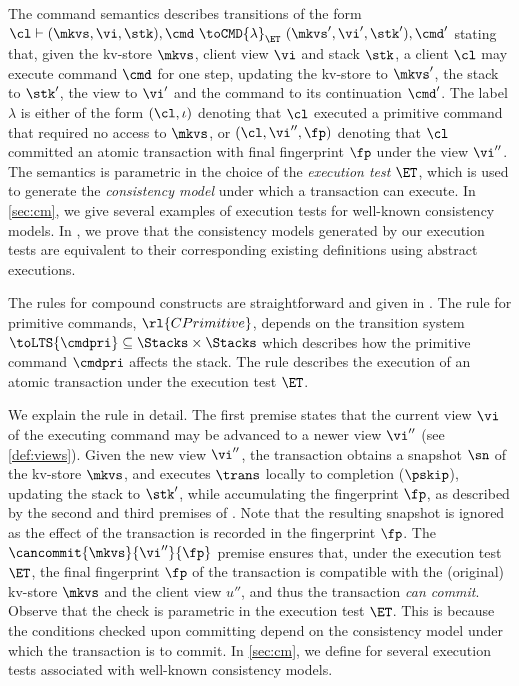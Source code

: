 %
The command semantics describes transitions of the form
\(\cl \vdash (\mkvs, \vi, \stk), \cmd \ \toCMD{\lambda}_{\ET} \ (\mkvs', \vi', \stk'), \cmd'\)
stating that,  given the kv-store \(\mkvs\), client view \(\vi\) and stack \(\stk\), 
a client \(\cl\) may execute command \(\cmd\) for one step, updating 
the kv-store to \(\mkvs'\), the stack to \(\stk'\), the view to \( \vi' \) and the command to its continuation \(\cmd'\).
The label \(\lambda\) is either of the form \((\cl, \iota)\) denoting that \(\cl\) executed a primitive command
that required no access to \(\mkvs\), 
or \((\cl, \vi'', \fp)\) denoting that \(\cl\) committed an atomic transaction with final fingerprint \(\fp\) under the view \(\vi''\).
The semantics is parametric in the choice of the \emph{execution test}
\(\ET\), which is used to generate the \emph{consistency model} under which a transaction can execute.
In \cref{sec:cm},  we give several examples of execution tests for well-known consistency models.
In \cite{shale-phd},  we prove that the consistency models generated by our execution tests are equivalent to their corresponding existing definitions using abstract executions. 

The rules for compound constructs are straightforward and given in \cite{shale-phd}.
The rule for primitive commands, \(\rl{CPrimitive}\), depends on the 
transition system \(\toLTS{\cmdpri} \subseteq \Stacks \times \Stacks\) 
which describes how the primitive command \(\cmdpri\) affects the stack.
The  rule describes the execution of an atomic 
transaction under the execution test \(\ET\). 


We explain the  rule in detail. 
The first premise states that the current view \(\vi\) of the executing command may be advanced to a newer view \(\vi''\) (see \cref{def:views}). 
Given the new view \(\vi''\), the transaction obtains a snapshot \(\sn\) of the kv-store \(\mkvs\), 
and executes \(\trans\) locally to completion (\(\pskip\)), updating the stack to \(\stk'\), while accumulating the fingerprint \(\fp\), 
as described by the second and third premises of .
Note that the resulting snapshot is ignored as the effect of the transaction is recorded in the fingerprint \(\fp\). 
The \(\cancommit{\mkvs}{\vi''}{\fp}\) premise ensures that,  under the execution test \(\ET\), 
the final fingerprint \(\fp\) of the transaction is compatible with the (original) kv-store
\(\mkvs\) and the client view \(u''\), and thus the transaction \emph{can commit}. 
Observe that the \cancommitname check is parametric in the execution test \(\ET\).
This is because the conditions checked upon committing depend on the consistency model under which the transaction is to commit. 
In \cref{sec:cm}, we define \cancommitname for several execution tests associated with well-known consistency models.


